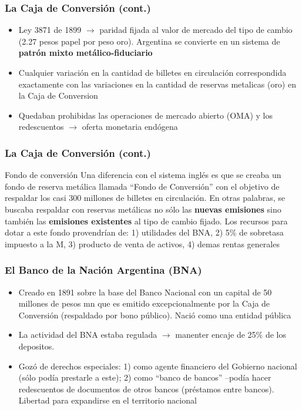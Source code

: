 \documentclass[14pt,aspectratio=169]{beamer}
\begin{document}
   \begin{frame}\frametitle{La Caja de Conversión (cont.)}
    \begin{itemize}\itemsep 10pt
      \item Ley 3871 de 1899 $\longrightarrow$ paridad fijada al valor
        de mercado del tipo de cambio (2.27 pesos papel por peso
        oro). Argentina se convierte en un sistema de \textbf{patrón
          mixto metálico-fiduciario}
        \item Cualquier variación en la cantidad de billetes en
          circulación correspondida exactamente con las variaciones en
          la cantidad de reservas metalicas (oro) en la Caja de
          Conversion
          \item Quedaban prohibidas las operaciones de mercado abierto
            (OMA) y los redescuentos $\longrightarrow$ oferta
            monetaria endógena 
       \end{itemize}
      \end{frame}


 \begin{frame}\frametitle{La Caja de Conversión (cont.)}
   \begin{block}{Fondo de conversión}
     Una diferencia con el sistema inglés es que se creaba un fondo de
     reserva metálica llamada ``Fondo de Conversión'' con el objetivo
     de respaldar los casi 300 millones de billetes en circulación. En
     otras palabras, se buscaba respaldar con reservas metálicas no
     sólo las \textbf{nuevas emisiones} sino también las
     \textbf{emisiones existentes} al tipo de cambio fijado. Los
     recursos para dotar a este fondo provendrían de: 1) utilidades
     del BNA, 2) 5\% de sobretasa impuesto a la M, 3) producto de
     venta de activos, 4) demas rentas generales
       \end{block}
      \end{frame}




 \begin{frame}\frametitle{El Banco de la Nación Argentina (BNA)}
   \begin{itemize}
\item Creado en 1891 sobre la base del Banco Nacional con un capital
  de 50 millones de pesos mn que es emitido excepcionalmente por la
  Caja de Conversión (respaldado por bono público). Nació como una
  entidad pública
  \item La actividad del BNA estaba regulada $\longrightarrow$
    manenter encaje de 25\% de los depositos.
    \item Gozó de derechos especiales: 1) como agente financiero del
      Gobierno nacional (sólo podía prestarle a este); 2) como ``banco
      de bancos'' --podía hacer redescuentos de documentos de otros
      bancos (préstamos entre bancos). Libertad para expandirse en el territorio nacional
    \end{itemize}
      \end{frame}
\end{document}
